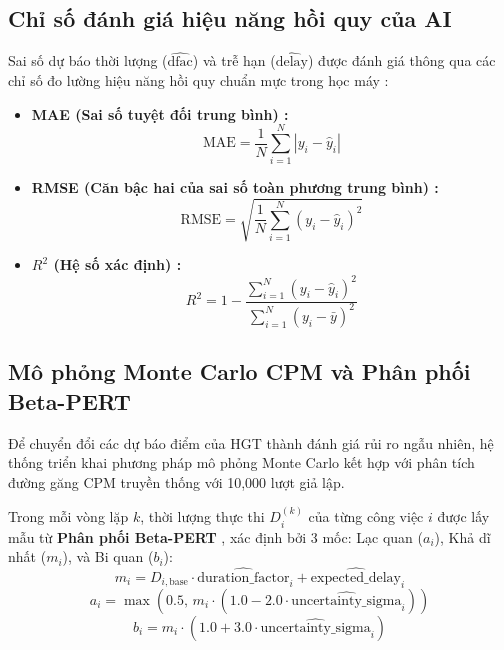 \subsection{Chỉ số đánh giá hiệu năng hồi quy của AI}
Sai số dự báo thời lượng ($\widehat{\text{dfac}}$) và trễ hạn ($\widehat{\text{delay}}$) được đánh giá thông qua các chỉ số đo lường hiệu năng hồi quy chuẩn mực trong học máy \cite{chai2014rmse, nagelkerke1991r2, goodfellow2016}:
\begin{itemize}
    \item \textbf{MAE (Sai số tuyệt đối trung bình) \cite{chai2014rmse}:}
    \begin{equation}
        \text{MAE} = \frac{1}{N} \sum_{i=1}^{N} |y_i - \hat{y}_i|
    \end{equation}
    \item \textbf{RMSE (Căn bậc hai của sai số toàn phương trung bình) \cite{chai2014rmse}:}
    \begin{equation}
        \text{RMSE} = \sqrt{\frac{1}{N} \sum_{i=1}^{N} (y_i - \hat{y}_i)^2}
    \end{equation}
    \item \textbf{$R^2$ (Hệ số xác định) \cite{nagelkerke1991r2}:}
    \begin{equation}
        R^2 = 1 - \frac{\sum_{i=1}^{N} (y_i - \hat{y}_i)^2}{\sum_{i=1}^{N} (y_i - \bar{y})^2}
    \end{equation}
\end{itemize}

\subsection{Mô phỏng Monte Carlo CPM và Phân phối Beta-PERT}
Để chuyển đổi các dự báo điểm của HGT thành đánh giá rủi ro ngẫu nhiên, hệ thống triển khai phương pháp mô phỏng Monte Carlo kết hợp với phân tích đường găng CPM truyền thống \cite{rubinstein2016simulation, vanhoucke2016integrated} với 10,000 lượt giả lập.

Trong mỗi vòng lặp $k$, thời lượng thực thi $D_{i}^{(k)}$ của từng công việc $i$ được lấy mẫu từ \textbf{Phân phối Beta-PERT} \cite{malcolm1959application, trietsch1993pert}, xác định bởi 3 mốc: Lạc quan ($a_i$), Khả dĩ nhất ($m_i$), và Bi quan ($b_i$):
\begin{equation}
    m_i = D_{i,\text{base}} \cdot \widehat{\text{duration\_factor}}_i + \widehat{\text{expected\_delay}}_i
\end{equation}
\begin{equation}
    a_i = \max\left( 0.5, \, m_i \cdot (1.0 - 2.0 \cdot \widehat{\text{uncertainty\_sigma}}_i) \right)
\end{equation}
\begin{equation}
    b_i = m_i \cdot (1.0 + 3.0 \cdot \widehat{\text{uncertainty\_sigma}}_i)
\end{equation}

